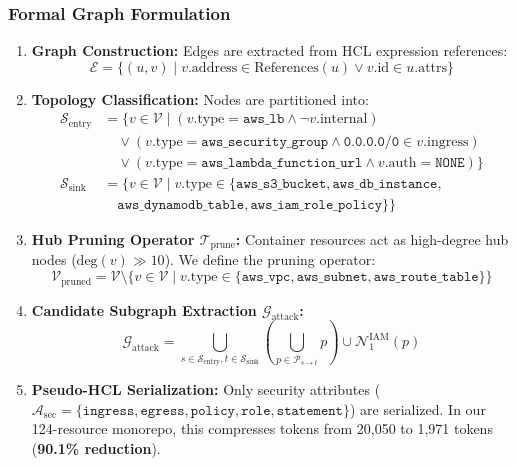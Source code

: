 \documentclass[conference]{IEEEtran}
\begin{document}
\subsubsection{Formal Graph Formulation}
\begin{enumerate}
    \item \textbf{Graph Construction:} Edges are extracted from HCL expression references:
    \begin{equation}
    \mathcal{E} = \{ (u, v) \mid v.\text{address} \in \text{References}(u) \lor v.\text{id} \in u.\text{attrs} \}
    \end{equation}
    \item \textbf{Topology Classification:} Nodes are partitioned into:
    \begin{align}
    \mathcal{S}_{\text{entry}} &= \{ v \in \mathcal{V} \mid (v.\text{type} = \texttt{aws\_lb} \land \neg v.\text{internal}) \nonumber \\
    &\quad \lor (v.\text{type} = \texttt{aws\_security\_group} \land \texttt{0.0.0.0/0} \in v.\text{ingress}) \nonumber \\
    &\quad \lor (v.\text{type} = \texttt{aws\_lambda\_function\_url} \land v.\text{auth} = \texttt{NONE}) \} \\
    \mathcal{S}_{\text{sink}} &= \{ v \in \mathcal{V} \mid v.\text{type} \in \{\texttt{aws\_s3\_bucket}, \texttt{aws\_db\_instance}, \nonumber \\
    &\quad \texttt{aws\_dynamodb\_table}, \texttt{aws\_iam\_role\_policy}\} \}
    \end{align}
    \item \textbf{Hub Pruning Operator $\mathcal{T}_{\text{prune}}$:} Container resources act as high-degree hub nodes ($\text{deg}(v) \gg 10$). We define the pruning operator:
    \begin{equation}
    \mathcal{V}_{\text{pruned}} = \mathcal{V} \setminus \{ v \in \mathcal{V} \mid v.\text{type} \in \{\texttt{aws\_vpc}, \texttt{aws\_subnet}, \texttt{aws\_route\_table}\} \}
    \end{equation}
    \item \textbf{Candidate Subgraph Extraction $\mathcal{G}_{\text{attack}}$:}
    \begin{equation}
    \mathcal{G}_{\text{attack}} = \bigcup_{s \in \mathcal{S}_{\text{entry}}, t \in \mathcal{S}_{\text{sink}}} \left( \bigcup_{p \in \mathcal{P}_{s \to t}} p \right) \cup \mathcal{N}_1^{\text{IAM}}(p)
    \end{equation}
    \item \textbf{Pseudo-HCL Serialization:} Only security attributes ($\mathcal{A}_{\text{sec}} = \{\texttt{ingress}, \texttt{egress}, \texttt{policy}, \texttt{role}, \texttt{statement}\}$) are serialized. In our 124-resource monorepo, this compresses tokens from 20,050 to 1,971 tokens (\textbf{90.1\% reduction}).
\end{enumerate}
\end{document}
